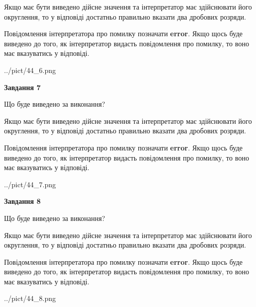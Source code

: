 \documentclass[12pt, ukrainian]{article}
\begin{document}
{\begin {Large}
Якщо має бути виведено дійсне значення та інтерпретатор має здійснювати його округлення, 
то у відповіді достатньо правильно вказати два дробових розряди.

Повідомлення інтерпретатора про помилку позначати \textbf{error}.
Якщо щось буде виведено до того, як інтерпретатор видасть повідомлення про помилку, 
то воно має вказуватись у відповіді. \par

\begin{center}
	{../pict/44_6.png}
\end{center}
\newpage

{\begin {center}\textbf{Завдання 7}\end {center}}\par
Що буде виведено за виконання? \par

Якщо має бути виведено дійсне значення та інтерпретатор має здійснювати його округлення, 
то у відповіді достатньо правильно вказати два дробових розряди.

Повідомлення інтерпретатора про помилку позначати \textbf{error}.
Якщо щось буде виведено до того, як інтерпретатор видасть повідомлення про помилку, 
то воно має вказуватись у відповіді. \par

\begin{center}
	{../pict/44_7.png}
\end{center}
\newpage

{\begin {center}\textbf{Завдання 8}\end {center}}\par
Що буде виведено за виконання? \par

Якщо має бути виведено дійсне значення та інтерпретатор має здійснювати його округлення, 
то у відповіді достатньо правильно вказати два дробових розряди.

Повідомлення інтерпретатора про помилку позначати \textbf{error}.
Якщо щось буде виведено до того, як інтерпретатор видасть повідомлення про помилку, 
то воно має вказуватись у відповіді. \par

\begin{center}
	{../pict/44_8.png}
\end{center}
\newpage


\end{Large}}
\end{document}
